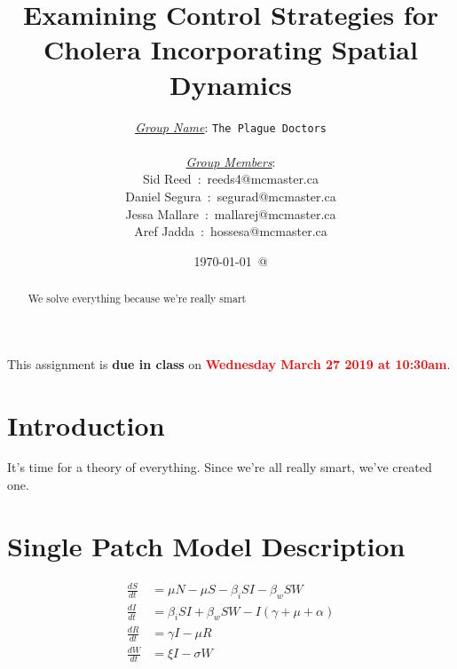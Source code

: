 \documentclass[12pt]{article}\usepackage[]{graphicx}\usepackage[]{color}
\begin{document}
\title{Examining Control Strategies for Cholera Incorporating Spatial Dynamics}
\author{
\underline{\emph{Group Name}}: \texttt{{\color{blue}The Plague Doctors}}\\\\
\underline{\emph{Group Members}}:\\
         Sid Reed\ :\ {\color{blue}reeds4@mcmaster.ca}\\
         Daniel Segura\ :\ {\color{blue}segurad@mcmaster.ca}\\
         Jessa Mallare\ :\ {\color{blue}mallarej@mcmaster.ca}\\
         Aref Jadda\ :\ {\color{blue}hossesa@mcmaster.ca}\\
}
\date{\today\ @ \thistime}
\maketitle
\bigskip
\noindent
This assignment is {\bfseries\color{red} due in class} on \textcolor{red}{\bf Wednesday March 27 2019 at 10:30am}.
\bigskip

\linenumbers

\begin{abstract}
We solve everything because we're really smart
\end{abstract}

\clearpage
\tableofcontents
\clearpage

\section{Introduction}

It's time for a theory of everything.  Since we're all really smart, we've created one.

\section{Single Patch Model Description}

	\begin{align*}
		\frac{dS}{dt}&= \mu N - \mu S - \beta_i SI - \beta_w S W  \\
		\frac{dI}{dt}&= \beta_i S I + \beta_w S W - I (\gamma + \mu + \alpha) \\
		\frac{dR}{dt}&= \gamma I - \mu R \\
		\frac{dW}{dt}&= \xi I  - \sigma W\\
	\end{align*}
\end{document}
